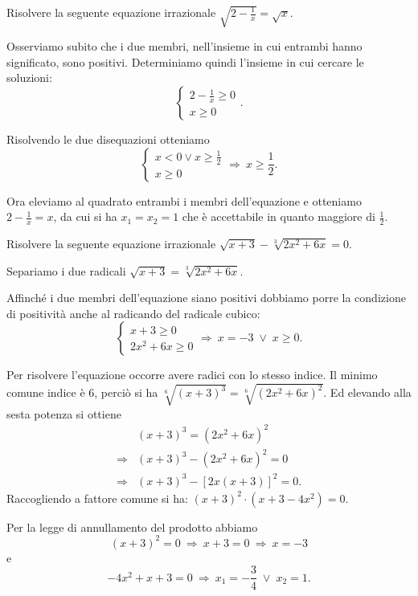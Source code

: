\begin{exrig}
\begin{esempio}
Risolvere la seguente equazione irrazionale $\sqrt{2-\frac 1 x}=\sqrt x$.

Osserviamo subito che i due membri, nell'insieme in cui entrambi hanno significato, sono positivi.
Determiniamo quindi l'insieme in cui cercare le soluzioni: 
\[\left\{\begin{array}{l}{2-\frac 1 x\ge 0}\\{x\ge 0}\end{array}\right..\]

Risolvendo le due disequazioni otteniamo 
\[\left\{\begin{array}{l}x<0\vee x\ge \frac 1 2\\{x\ge 0}\end{array}\right.\Rightarrow\: x\ge \frac 1 2.\]

Ora eleviamo al quadrato entrambi i membri dell'equazione e otteniamo $2-\frac 1 x=x$, da cui si ha $x_1=x_2=1$ che è accettabile in quanto maggiore di $\frac 1 2$.
\end{esempio}
\begin{esempio}
Risolvere la seguente equazione irrazionale $\sqrt{x+3}-\sqrt[3]{2x^2+6x}=0$.

Separiamo i due radicali $\sqrt{x+3}=\sqrt[3]{2x^2+6x}$.

Affinché i due membri dell'equazione siano positivi dobbiamo porre la condizione di positività anche al radicando del radicale cubico: 
\[\left\{\begin{array}{l}{x+3\ge 0}\\{2x^2+6x\ge 0}\end{array}\right.\Rightarrow\: x=-3\;\vee\; x\ge 0.\]

Per risolvere l'equazione occorre avere radici con lo stesso indice. Il minimo comune indice è $6$, perciò si ha $\sqrt[6]{(x+3)^3}=\sqrt[6]{\left(2x^2+6x\right)^2}$. Ed elevando alla sesta potenza si ottiene
\begin{align*}
&(x+3)^3=\left(2x^2+6x\right)^2\\
\Rightarrow & (x+3)^3-\left(2x^2+6x\right)^2=0\\
\Rightarrow & (x+3)^3-[2x(x+3)]^2=0.
\end{align*}
Raccogliendo a fattore comune si ha: $(x+3)^2\cdot \left(x+3-4x^2\right)=0$.

Per la legge di annullamento del prodotto abbiamo 
\[(x+3)^2=0\:\Rightarrow\: x+3=0\:\Rightarrow\: x=-3\] e 
\[-4x^2+x+3=0\:\Rightarrow\:x_1=-\frac 3 4\;\vee\; x_2=1.\]


\end{esempio}
\end{exrig}
